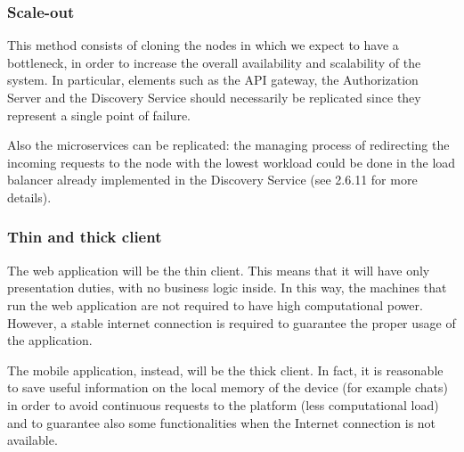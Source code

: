 
\subsubsection{Scale-out}
This method consists of cloning the nodes in which we expect to have a bottleneck, in order to increase the overall availability and scalability of the system. In particular, elements such as the API gateway, the Authorization Server and the Discovery Service should necessarily  be replicated since they represent a single point of failure. 

Also the microservices can be replicated: the managing process of redirecting the incoming requests to the node with the lowest workload could be done in the load balancer already implemented in the Discovery Service (see 2.6.11 for more details).

\subsubsection{Thin and thick client}
The web application will be the thin client. This means that it will have only presentation duties, with no business logic inside. In this way, the machines that run the web application are not required to have high computational power. However, a stable internet connection is required to guarantee the proper usage of the application.

The mobile application, instead, will be the thick client. In fact, it is reasonable to save useful information on the local memory of the device (for example chats) in order to avoid continuous requests to the platform (less computational load) and to guarantee also some functionalities when the Internet connection is not available.


